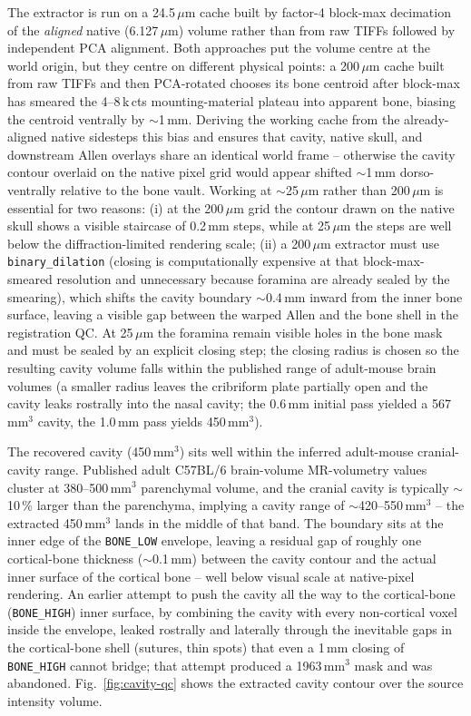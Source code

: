 \documentclass{compactarticle}
\begin{document}
The extractor is run on a 24.5\,$\mu$m cache built by factor-4 block-max
decimation of the \emph{aligned} native (6.127\,$\mu$m) volume rather
than from raw TIFFs followed by independent PCA alignment. Both
approaches put the volume centre at the world origin, but they centre
on different physical points: a 200\,$\mu$m cache built from raw TIFFs
and then PCA-rotated chooses its bone centroid after block-max has
smeared the 4--8\,k\,cts mounting-material plateau into apparent bone,
biasing the centroid ventrally by $\sim$1\,mm. Deriving the working
cache from the already-aligned native sidesteps this bias and ensures
that cavity, native skull, and downstream Allen overlays share an
identical world frame -- otherwise the cavity contour overlaid on the
native pixel grid would appear shifted $\sim$1\,mm dorso-ventrally
relative to the bone vault. Working at $\sim$25\,$\mu$m rather than
200\,$\mu$m is essential for two reasons: (i) at the 200\,$\mu$m grid
the contour drawn on the native skull shows a visible staircase of
0.2\,mm steps, while at 25\,$\mu$m the steps are well below the
diffraction-limited rendering scale; (ii) a 200\,$\mu$m extractor must
use \texttt{binary\_dilation} (closing is computationally expensive at
that block-max-smeared resolution and unnecessary because foramina are
already sealed by the smearing), which shifts the cavity boundary
$\sim$0.4\,mm inward from the inner bone surface, leaving a visible gap
between the warped Allen and the bone shell in the registration QC.
At 25\,$\mu$m the foramina remain visible holes in the bone mask and
must be sealed by an explicit closing step; the closing radius is
chosen so the resulting cavity volume falls within the published range
of adult-mouse brain volumes (a smaller radius leaves the cribriform
plate partially open and the cavity leaks rostrally into the nasal
cavity; the 0.6\,mm initial pass yielded a 567\,mm$^3$ cavity, the
1.0\,mm pass yields 450\,mm$^3$).

The recovered cavity (450\,mm$^3$) sits well within the inferred
adult-mouse cranial-cavity range. Published adult C57BL/6 brain-volume
MR-volumetry values cluster at 380--500\,mm$^3$ parenchymal volume,
and the cranial cavity is typically $\sim$10\,\% larger than the
parenchyma, implying a cavity range of $\sim$420--550\,mm$^3$ -- the
extracted 450\,mm$^3$ lands in the middle of that band. The boundary sits at the inner edge of the
\texttt{BONE\_LOW} envelope, leaving a residual gap of roughly one
cortical-bone thickness ($\sim$0.1\,mm) between the cavity contour and
the actual inner surface of the cortical bone -- well below visual
scale at native-pixel rendering. An earlier attempt to push the cavity
all the way to the cortical-bone (\texttt{BONE\_HIGH}) inner surface,
by combining the cavity with every non-cortical voxel inside the
envelope, leaked rostrally and laterally through the inevitable gaps
in the cortical-bone shell (sutures, thin spots) that even a 1\,mm
closing of \texttt{BONE\_HIGH} cannot bridge; that attempt produced a
1963\,mm$^3$ mask and was abandoned.
Fig.~\ref{fig:cavity-qc} shows the extracted cavity contour over the
source intensity volume.
\end{document}
